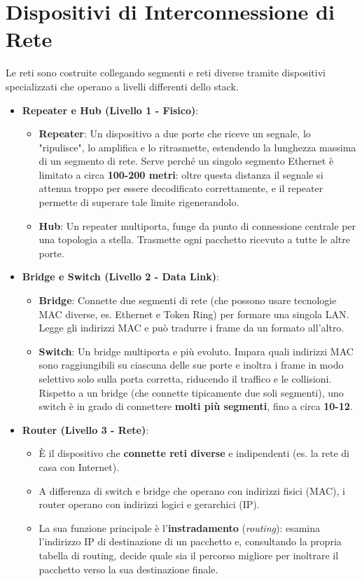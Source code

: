 \section{Dispositivi di Interconnessione di Rete}
Le reti sono costruite collegando segmenti e reti diverse tramite dispositivi specializzati che operano a livelli differenti dello stack.
\begin{itemize}
    \item \textbf{Repeater e Hub (Livello 1 - Fisico)}:
    \begin{itemize}
        \item \textbf{Repeater}: Un dispositivo a due porte che riceve un segnale, lo "ripulisce", lo amplifica e lo ritrasmette, estendendo la lunghezza massima di un segmento di rete. Serve perché un singolo segmento Ethernet è limitato a circa \textbf{100-200 metri}: oltre questa distanza il segnale si attenua troppo per essere decodificato correttamente, e il repeater permette di superare tale limite rigenerandolo.
        \item \textbf{Hub}: Un repeater multiporta, funge da punto di connessione centrale per una topologia a stella. Trasmette ogni pacchetto ricevuto a tutte le altre porte.
    \end{itemize}
    \item \textbf{Bridge e Switch (Livello 2 - Data Link)}:
    \begin{itemize}
        \item \textbf{Bridge}: Connette due segmenti di rete (che possono usare tecnologie MAC diverse, es. Ethernet e Token Ring) per formare una singola LAN. Legge gli indirizzi MAC e può tradurre i frame da un formato all'altro.
        \item \textbf{Switch}: Un bridge multiporta e più evoluto. Impara quali indirizzi MAC sono raggiungibili su ciascuna delle sue porte e inoltra i frame in modo selettivo solo sulla porta corretta, riducendo il traffico e le collisioni. Rispetto a un bridge (che connette tipicamente due soli segmenti), uno switch è in grado di connettere \textbf{molti più segmenti}, fino a circa \textbf{10-12}.
    \end{itemize}
    \item \textbf{Router (Livello 3 - Rete)}:
    \begin{itemize}
        \item È il dispositivo che \textbf{connette reti diverse} e indipendenti (es. la rete di casa con Internet).
        \item A differenza di switch e bridge che operano con indirizzi fisici (MAC), i router operano con indirizzi logici e gerarchici (IP).
        \item La sua funzione principale è l'\textbf{instradamento} (\textit{routing}): esamina l'indirizzo IP di destinazione di un pacchetto e, consultando la propria tabella di routing, decide quale sia il percorso migliore per inoltrare il pacchetto verso la sua destinazione finale.
    \end{itemize}
\end{itemize}

